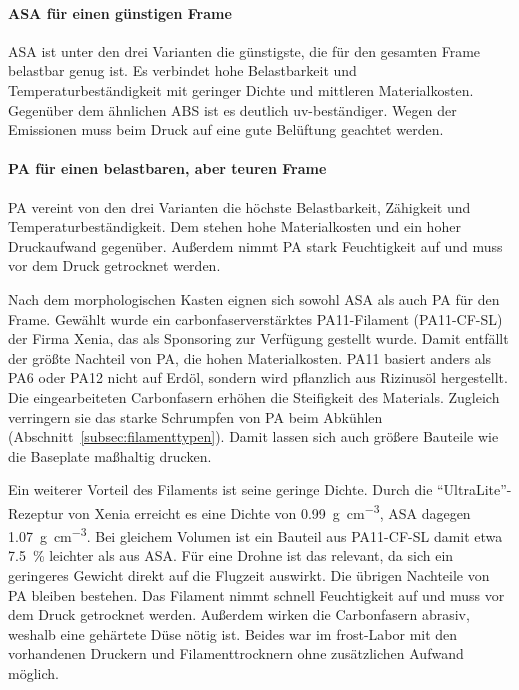         \paragraph{ASA für einen günstigen Frame}
        ASA ist unter den drei Varianten die günstigste, die für den gesamten Frame belastbar genug ist. Es verbindet hohe Belastbarkeit und Temperaturbeständigkeit mit geringer Dichte und mittleren Materialkosten. Gegenüber dem ähnlichen ABS ist es deutlich \gls{uv}-beständiger. Wegen der Emissionen muss beim Druck auf eine gute Belüftung geachtet werden.

        \paragraph{PA für einen belastbaren, aber teuren Frame}
        PA vereint von den drei Varianten die höchste Belastbarkeit, Zähigkeit und Temperaturbeständigkeit. Dem stehen hohe Materialkosten und ein hoher Druckaufwand gegenüber. Außerdem nimmt PA stark Feuchtigkeit auf und muss vor dem Druck getrocknet werden.

        Nach dem morphologischen Kasten eignen sich sowohl ASA als auch PA für den Frame. Gewählt wurde ein carbonfaserverstärktes PA11-Filament (PA11-CF-SL) der Firma Xenia, das als Sponsoring zur Verfügung gestellt wurde. Damit entfällt der größte Nachteil von PA, die hohen Materialkosten. PA11 basiert anders als PA6 oder PA12 nicht auf Erdöl, sondern wird pflanzlich aus Rizinusöl hergestellt. Die eingearbeiteten Carbonfasern erhöhen die Steifigkeit des Materials. Zugleich verringern sie das starke Schrumpfen von PA beim Abkühlen (Abschnitt~\ref{subsec:filamenttypen}). Damit lassen sich auch größere Bauteile wie die Baseplate maßhaltig drucken. %

        Ein weiterer Vorteil des Filaments ist seine geringe Dichte. Durch die \enquote{UltraLite}-Rezeptur von Xenia erreicht es eine Dichte von \SI[per-mode=symbol]{0,99}{\gram\per\centi\metre\cubed}, ASA dagegen \SI[per-mode=symbol]{1,07}{\gram\per\centi\metre\cubed}. Bei gleichem Volumen ist ein Bauteil aus PA11-CF-SL damit etwa \SI{7,5}{\percent} leichter als aus ASA. Für eine Drohne ist das relevant, da sich ein geringeres Gewicht direkt auf die Flugzeit auswirkt. Die übrigen Nachteile von PA bleiben bestehen. Das Filament nimmt schnell Feuchtigkeit auf und muss vor dem Druck getrocknet werden. Außerdem wirken die Carbonfasern abrasiv, weshalb eine gehärtete Düse nötig ist. Beides war im \gls{frost}-Labor mit den vorhandenen Druckern und Filamenttrocknern ohne zusätzlichen Aufwand möglich. %

